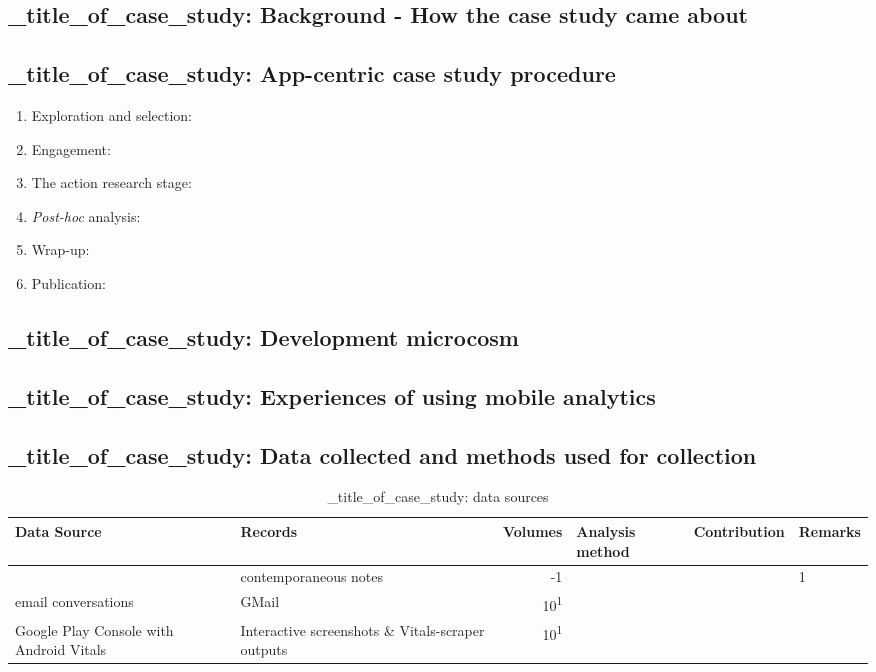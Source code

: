 \subsection{_title_of_case_study: Background - How the case study came about}

\subsection{_title_of_case_study: App-centric case study procedure}
{\small
\begin{enumerate}
    \itemsep0em
    \item Exploration and selection:
    \item Engagement:
    \item The action research stage:
    \item \textit{Post-hoc} analysis:
    \item Wrap-up:
    \item Publication:
\end{enumerate}
}


\subsection{_title_of_case_study: Development microcosm}

\subsection{_title_of_case_study: Experiences of using mobile analytics}

\subsection{_title_of_case_study: Data collected and methods used for collection}

\begin{table}
    \centering
    \footnotesize
    \tabcolsep=0.12cm
    \begin{tabular}{p{2.4cm}p{2.4cm}rp{2.4cm}p{3cm}p{2.5cm}}
        Data Source & Records & Volumes & Analysis method & Contribution & Remarks \\
        \toprule
          & contemporaneous notes\footnotemark & -1 & &  & 1  \\
         email conversations & GMail & 10\textsuperscript{1} & &  &  \\
         Google Play Console with Android Vitals &Interactive screenshots \& Vitals-scraper outputs &10\textsuperscript{1} & &  &  \\
         \bottomrule
    \end{tabular}
    \caption{_title_of_case_study: data sources}
    \label{tab:blank_case_study-data-sources}
\end{table}


